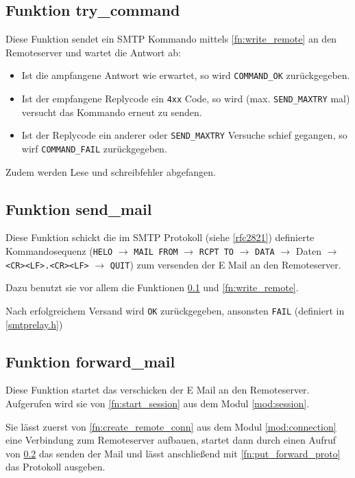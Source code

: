 \documentclass[pdftex,final,a4paper,10pt,notitlepage,halfparskip]{scrreprt}
\begin{document}
\subsection{Funktion try\_command}\label{fn:try_command}
Diese Funktion sendet ein SMTP Kommando mittels \ref{fn:write_remote} an den Remoteserver und wartet die Antwort ab: 
\begin{itemize}
  \item Ist die ampfangene Antwort wie erwartet, so wird \texttt{COMMAND\_OK} zurückgegeben. 
  \item Ist der empfangene Replycode ein \texttt{4xx} Code, so wird (max. \texttt{SEND\_MAXTRY} mal) versucht das Kommando erneut zu senden. 
  \item Ist der Replycode ein anderer oder \texttt{SEND\_MAXTRY} Versuche schief gegangen, so wirf \texttt{COMMAND\_FAIL} zurückgegeben.
\end{itemize}
Zudem werden Lese und schreibfehler abgefangen.


\subsection{Funktion send\_mail}\label{fn:send_mail}
Diese Funktion schickt die im SMTP Protokoll (siehe \ref{rfc2821}) definierte Kommandosequenz (\texttt{HELO} $\rightarrow$ \texttt{MAIL FROM} $\rightarrow$ \texttt{RCPT TO} $\rightarrow$ \texttt{DATA} $\rightarrow$ Daten $\rightarrow$ \texttt{<CR><LF>.<CR><LF>} $\rightarrow$ \texttt{QUIT}) zum versenden der E Mail an den Remoteserver.

Dazu benutzt sie vor allem die Funktionen \ref{fn:try_command} und \ref{fn:write_remote}.

Nach erfolgreichem Versand wird \texttt{OK} zurückgegeben, ansonsten \texttt{FAIL} (definiert in \ref{smtprelay.h})

\subsection{Funktion forward\_mail}\label{fn:forward_mail}
Diese Funktion startet das verschicken der E Mail an den Remoteserver. Aufgerufen wird sie von \ref{fn:start_session} aus dem Modul \ref{mod:session}.

Sie lässt zuerst von \ref{fn:create_remote_conn} aus dem Modul \ref{mod:connection} eine Verbindung zum Remoteserver aufbauen, startet dann durch einen Aufruf von \ref{fn:send_mail} das senden der Mail und lässt anschließend mit \ref{fn:put_forward_proto} das Protokoll ausgeben. 
\end{document}
